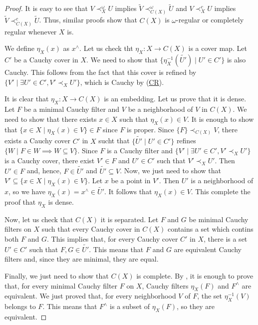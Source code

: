 \documentclass[reqno]{amsart}
\newcommand{\axref}[1]{(\hyperref[ax:#1]{#1})}
\theoremstyle{definition}
\theoremstyle{remark}
\numberwithin{figure}{section}
\newcommand{\rb}{\prec}
\begin{document}
\begin{proof}
It is easy to see that $V \rb_X^\omega U$ implies $\widetilde{V} \rb_{C(X)}^\omega \widetilde{U}$ and $V \rb_X^c U$ implies $\widetilde{V} \rb_{C(X)}^c \widetilde{U}$.
Thus, similar proofs show that $C(X)$ is $\omega$-regular or completely regular whenever $X$ is.

We define $\eta_X(x)$ as $x^\wedge$.
Let us check tht $\eta_X : X \to C(X)$ is a cover map.
Let $C'$ be a Cauchy cover in $X$.
We need to show that $\{ \eta_X^{-1}(\widetilde{U'}) \mid U' \in C' \}$ is also Cauchy.
This follows from the fact that this cover is refined by $\{ V' \mid \exists U' \in C', V' \rb_X U' \}$, which is Cauchy by \axref{CR}.

It is clear that $\eta_X : X \to C(X)$ is an embedding.
Let us prove that it is dense.
Let $F$ be a minimal Cauchy filter and $V$ be a neighborhood of $V$ in $C(X)$.
We need to show that there exists $x \in X$ such that $\eta_X(x) \in V$.
It is enough to show that $\{ x \in X \mid \eta_X(x) \in V \} \in F$ since $F$ is proper.
Since $\{ F \} \rb_{C(X)} V$, there exists a Cauchy cover $C'$ in $X$ sucht that $\{ \widetilde{U'} \mid U' \in C' \}$ refines $\{ W \mid F \in W \implies W \subseteq V \}$.
Since $F$ is a Cauchy filter and $\{ V' \mid \exists U' \in C', V' \rb_X U' \}$ is a Cauchy cover, there exist $V' \in F$ and $U' \in C'$ such that $V' \rb_X U'$.
Then $U' \in F$ and, hence, $F \in \widetilde{U'}$ and $\widetilde{U'} \subseteq V$.
Now, we just need to show that $V' \subseteq \{ x \in X \mid \eta_X(x) \in V \}$.
Let $x$ be a point in $V'$.
Then $U'$ is a neighborhood of $x$, so we have $\eta_X(x) = x^\wedge \in \widetilde{U'}$.
It follows that $\eta_X(x) \in V$.
This complete the proof that $\eta_X$ is dense.

Now, let us check that $C(X)$ it is separated.
Let $F$ and $G$ be minimal Cauchy filters on $X$ such that every Cauchy cover in $C(X)$ contains a set which contins both $F$ and $G$.
This implies that, for every Cauchy cover $C'$ in $X$, there is a set $U' \in C'$ such that $F,G \in \widetilde{U'}$.
This means that $F$ and $G$ are equivalent Cauchy filters and, since they are minimal, they are equal.

Finally, we just need to show that $C(X)$ is complete.
By , it is enough to prove that, for every minimal Cauchy filter $F$ on $X$, Cauchy filters $\eta_X(F)$ and $F^\wedge$ are equivalent.
We just proved that, for every neighborhood $V$ of $F$, the set $\eta_X^{-1}(V)$ belongs to $F$.
This means that $F^\wedge$ is a subset of $\eta_X(F)$, so they are equivalent.
\end{proof}
\end{document}
